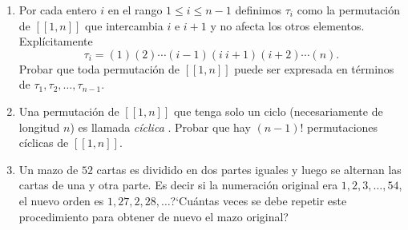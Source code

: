 \begin{enumerate}[1)]
\item Por cada entero $i$ en el rango $1 \le i \le n-1$ definimos $\tau_i$ como la permutación de $[[1,n]]$ que intercambia $i$ e $i+1$ y no afecta los otros elementos. Explícitamente 
$$
\tau_i = (1)(2)\cdots(i-1)(i\ i+1)(i+2)\cdots(n).
$$
Probar que toda permutación de $[[1,n]]$ puede ser expresada en términos de $\tau_1,\tau_2,\ldots,\tau_{n-1}$. 

\item Una permutación de $[[1,n]]$ que tenga solo un ciclo (necesariamente de longitud $n$) es llamada {\it cíclica}  . Probar que hay $(n-1)!$ permutaciones cíclicas de $[[1,n]]$.

\item Un mazo de $52$ cartas es dividido en dos partes iguales y luego se alternan las cartas de una y otra parte. Es decir si la numeración original era $1,2,3,\ldots,54$, el nuevo orden es $1,27,2,28,\ldots$?`Cuántas veces se debe repetir este procedimiento para obtener de nuevo el mazo original? 
\end{enumerate}
